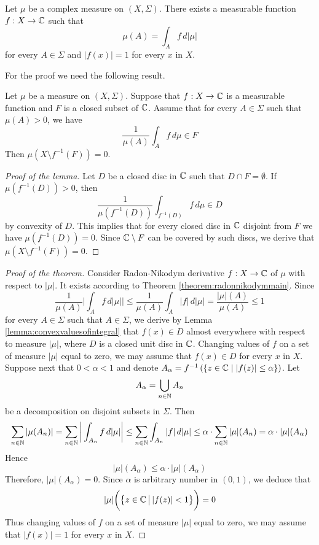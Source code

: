 \begin{theorem}\label{theorem:structureofcomplexmeasures}
Let $\mu$ be a complex measure on $(X,\Sigma)$. There exists a measurable function $f:X\rightarrow {\mathbb C}$ such that
$$\mu(A) = \int_Af\,d|\mu|$$
for every $A\in \Sigma$ and $|f(x)|=1$ for every $x$ in $X$.
\end{theorem}
\noindent
For the proof we need the following result.
\begin{lemma}\label{lemma:convexvaluesofintegral}
Let $\mu$ be a measure on $(X,\Sigma)$. Suppose that $f:X\rightarrow {\mathbb C}$ is a measurable function and $F$ is a closed subset of ${\mathbb C}$. Assume that for every $A\in \Sigma$ such that $\mu(A)>0$, we have
$$\frac{1}{\mu(A)}\int_A f\,d\mu \in F$$
Then $\mu\left(X\setminus f^{-1}(F)\right)=0$.
\end{lemma}
\begin{proof}[Proof of the lemma]
Let $D$ be a closed disc in ${\mathbb C}$ such that $D\cap F = \emptyset$. If $\mu\left(f^{-1}(D)\right) > 0$, then
$$\frac{1}{\mu\left(f^{-1}(D)\right)}\int_{f^{-1}(D)}f\,d\mu \in D$$
by convexity of $D$. This implies that for every closed disc in ${\mathbb C}$ disjoint from $F$ we have $\mu\left(f^{-1}(D)\right) = 0$. Since ${\mathbb C}\setminus F$ can be covered by such discs, we derive that $\mu\left(X\setminus f^{-1}(F)\right)=0$.
\end{proof}

\begin{proof}[Proof of the theorem]
Consider Radon-Nikodym derivative $f:X\rightarrow {\mathbb C}$ of $\mu$ with respect to $|\mu|$. It exists according to Theorem \ref{theorem:radonnikodymmain}. Since
$$\frac{1}{\mu(A)}\bigg|\int_Af\,d|\mu|\bigg| \leq \frac{1}{\mu(A)}\int_A|f|\,d|\mu| = \frac{|\mu|(A)}{\mu(A)}\leq 1$$
for every $A\in \Sigma$ such that $A\in \Sigma$, we derive by Lemma \ref{lemma:convexvaluesofintegral} that $f(x)\in D$ almost everywhere with respect to measure $|\mu|$, where $D$ is a closed unit disc in ${\mathbb C}$. Changing values of $f$ on a set of measure $|\mu|$ equal to zero, we may assume that $f(x)\in D$ for every $x$ in $X$.\\
Suppose next that  $0<\alpha < 1$ and denote $A_{\alpha} = f^{-1}\left(\{z\in {\mathbb C}\mid|f(z)|\leq \alpha \}\right)$. Let
$$A_{\alpha} = \bigcup_{n\in {\mathbb N}}A_n$$
be a decomposition on disjoint subsets in $\Sigma$. Then
$$\sum_{n\in {\mathbb N}}|\mu(A_n)| = \sum_{n\in {\mathbb N}}\bigg|\int_{A_n}f\,d|\mu|\bigg|\leq  \sum_{n\in {\mathbb N}}\int_{A_n}|f|\,d|\mu| \leq \alpha \cdot \sum_{n\in {\mathbb N}} |\mu|(A_n) = \alpha\cdot |\mu|(A_{\alpha})$$
Hence
$$|\mu|(A_{\alpha}) \leq \alpha\cdot |\mu|(A_{\alpha})$$
Therefore, $|\mu|(A_{\alpha})=0$. Since $\alpha$ is arbitrary number in $(0,1)$, we deduce that
$$|\mu|\bigg(\big\{z\in {\mathbb C}\,\big|\,|f(z)| < 1\big\}\bigg) = 0$$
Thus changing values of $f$ on a set of measure $|\mu|$ equal to zero, we may assume that $|f(x)|=1$ for every $x$ in $X$.
\end{proof}

